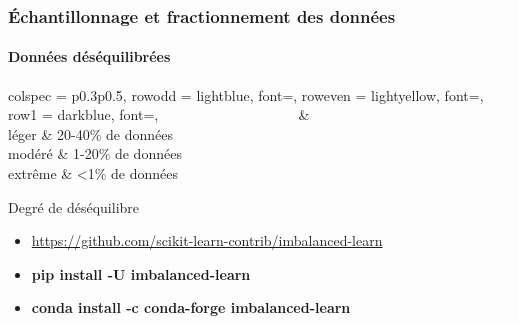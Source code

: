 \documentclass[xcolor=table]{beamer}
\begin{document}
\begin{frame}
	\frametitle{Échantillonnage et fractionnement des données}
	\framesubtitle{Données déséquilibrées}
	
	\begin{table}
	\begin{tblr}{
			colspec = {p{0.3\textwidth}p{0.5\textwidth}},
			row{odd} = {lightblue, font=\small},
			row{even} = {lightyellow, font=\small},
			row{1} = {darkblue, font=\bfseries},
		}
			\textcolor{white}{Degré de déséquilibre} & \textcolor{white}{Proportion de classe minoritaire} \\
			léger & 20-40\% de données \\
			modéré & 1-20\% de données \\
			extrême &	\textless 1\% de données \\
	\end{tblr}
	\caption{Degré de déséquilibre \cite{2021-google-prep}}
	\end{table}

	\begin{itemize}
		\item \url{https://github.com/scikit-learn-contrib/imbalanced-learn}
		\item \textbf{pip install -U imbalanced-learn}
		\item \textbf{conda install -c conda-forge imbalanced-learn}
	\end{itemize}
	
\end{frame}
\end{document}
